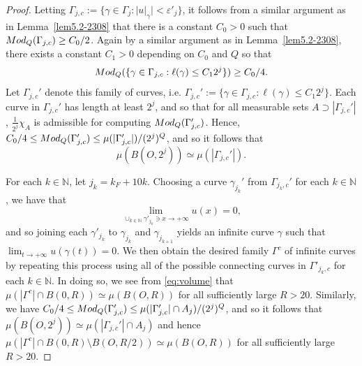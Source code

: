 \documentclass[10pt]{amsart}
\numberwithin{equation}{section}
\newcommand{\Mod}{{\rm Mod}}
\newcommand{\N}{\mathbb{N}}
\begin{document}
\begin{proof}
Letting $\Gamma_{j,c}:=\{\gamma\in \Gamma_j:|u|_\gamma|<\varepsilon'_j\}$, it follows from a similar argument as in Lemma~\ref{lem5.2-2308} that there is a constant $C_0>0$ such that $\Mod_Q(\Gamma_{j,c})\ge C_0/2$.  Again by a similar argument as in Lemma~\ref{lem5.2-2308}, there exists a constant $C_1>0$ depending on $C_0$ and $Q$ so that 
\begin{equation}\label{eq3.21-0307}
\Mod_Q(\{\gamma\in\Gamma_{j,c}:\ell(\gamma)\le C_1 2^j\})\ge C_0/4.
\end{equation}
Let $\Gamma_{j,c}'$ denote this family of curves, i.e. $\Gamma_{j,c}':=\{\gamma\in\Gamma_{j,c}:\ell(\gamma)\le C_1 2^j\}$.  Each curve in $\Gamma_{j,c}'$ has length at least $2^j$, and so that for all measurable sets $A\supset |\Gamma_{j,c}'|$, $\frac{1}{2^j}\chi_{A}$ is admissible for computing $\Mod_Q(\Gamma_{j,c}')$.  Hence, $C_0/4\le\Mod_Q(\Gamma_{j,c}')\le\mu(|\Gamma_{j,c}'|)/(2^j)^Q$,
and so it follows that 
\begin{equation}\label{eq:volume}
\mu(B(O,2^j))\simeq\mu(|\Gamma_{j,c}'|).
\end{equation}

For each $k\in\N$, let $j_k=k_F+10k$. 
 Choosing a curve $\gamma_{j_k}'$ from $\Gamma_{j_k,c}'$ for each $k\in\mathbb{N}$, we have that 
\[
\lim_{\cup_{k\in\mathbb{N}}\gamma'_{j_k}\ni x\to+\infty}u(x)=0,
\]
and so joining each $\gamma'_{j_k}$ to $\gamma_{j_k}$ and $\gamma_{j_{k+1}}$  yields an infinite curve $\gamma$ such that $\lim_{t\to+\infty}u(\gamma(t))=0$.  We then obtain the desired family $\Gamma^c$ of infinite curves by repeating this process using all of the possible connecting curves in $\Gamma'_{j_k,c}$ for each $k\in\mathbb{N}$.  In doing so, we see from \eqref{eq:volume} that $\mu(|\Gamma^c|\cap B(0,R))\simeq\mu(B(O,R))$ for all sufficiently large $R>20$. Similarly, we have 
$C_0/4\le\Mod_Q(\Gamma_{j,c}')\le\mu(|\Gamma_{j,c}'|\cap A_j)/(2^j)^Q$,
and so it follows that $\mu(B(O,2^j))\simeq\mu(|\Gamma_{j,c}'|\cap A_j)$ and hence $\mu(|\Gamma^c|\cap B(0,R)\setminus B(O,R/2))\simeq\mu(B(O,R))$ for all sufficiently large $R>20$.


\end{proof}
\end{document}
